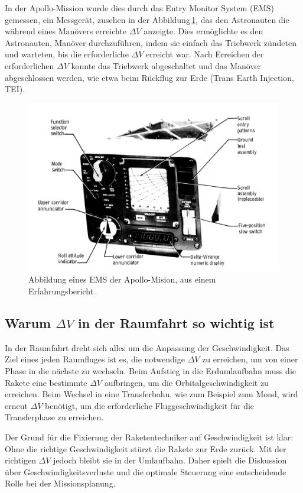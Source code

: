 In der Apollo-Mission wurde dies durch das Entry Monitor System (EMS) gemessen, ein Messgerät, zusehen in der Abbildung\,\ref{fig:leo:ems}, das den Astronauten die während eines Manövers erreichte \(\Delta V\) anzeigte. 
Dies ermöglichte es den Astronauten, Manöver durchzuführen, indem sie einfach das Triebwerk zündeten und warteten, bis die erforderliche \(\Delta V\) erreicht war. 
Nach Erreichen der erforderlichen \(\Delta V\) konnte das Triebwerk abgeschaltet und das Manöver abgeschlossen werden, wie etwa beim Rückflug zur Erde (Trans Earth Injection, TEI).


\begin{figure}
	\centering
	\includegraphics[width=\linewidth]{papers/leo/Grafiken/EMS.png}
	\caption{Abbildung eines EMS der Apollo-Mision, aus einem Erfahrungsbericht\,\cite{wilson1976apollo}.}
	\label{fig:leo:ems}
\end{figure}


\subsection{Warum \(\Delta V\) in der Raumfahrt so wichtig ist}
In der Raumfahrt dreht sich alles um die Anpassung der Geschwindigkeit. 
Das Ziel eines jeden Raumfluges ist es, die notwendige \(\Delta V\) zu erreichen, um von einer Phase in die nächste zu wechseln. 
Beim Aufstieg in die Erdumlaufbahn muss die Rakete eine bestimmte \(\Delta V\) aufbringen, um die Orbitalgeschwindigkeit zu erreichen. 
Beim Wechsel in eine Transferbahn, wie zum Beispiel zum Mond, wird erneut \(\Delta V\) benötigt, um die erforderliche Fluggeschwindigkeit für die Transferphase zu erreichen.

Der Grund für die Fixierung der Raketentechniker auf Geschwindigkeit ist klar: Ohne die richtige Geschwindigkeit stürzt die Rakete zur Erde zurück. 
Mit der richtigen \(\Delta V\) jedoch bleibt sie in der Umlaufbahn. Daher spielt die Diskussion über Geschwindigkeitsverluste und die optimale Steuerung eine entscheidende Rolle bei der Missionsplanung.

